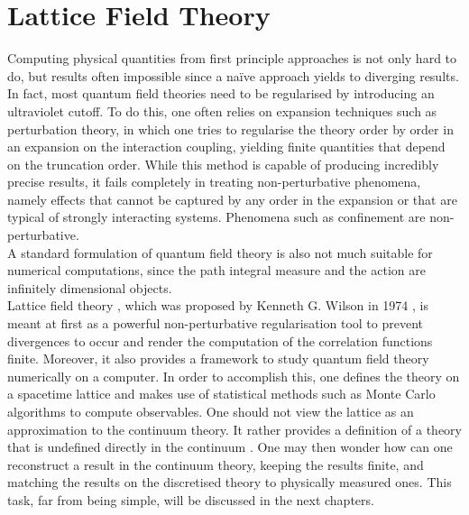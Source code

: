 \section{Lattice Field Theory}
Computing physical quantities from first principle approaches is not only hard to do, but results often impossible since a na\"ive approach yields to diverging results. In fact, most quantum field theories need to be regularised by introducing an ultraviolet cutoff. To do this, one often relies on expansion techniques such as perturbation theory, in which one tries to regularise the theory order by order in an expansion on the interaction coupling, yielding finite quantities that depend on the truncation order.  While this method is capable of producing incredibly precise results, it fails completely in treating non-perturbative phenomena, namely effects that cannot be captured by any order in the expansion or that are typical of strongly interacting systems.
Phenomena such as confinement are non-perturbative.\\
A standard formulation of quantum field theory is also not much suitable for numerical computations, since the path integral measure and the action are infinitely dimensional objects. \\
Lattice field theory \cite{Montvay1994QuantumLattice,rothe_LGT,gattringer_LQCD,creutz_2023}, which was proposed by Kenneth G. Wilson in 1974 \cite{wilson_lqcd}, is meant at first as a powerful non-perturbative regularisation tool to prevent divergences to occur and render the computation of the correlation functions finite. Moreover, it also provides a framework to study quantum field theory numerically on a computer. In order to accomplish this, one defines the theory on a spacetime lattice and makes use of statistical methods such as Monte Carlo algorithms to compute observables. 
One should not view the lattice as an approximation to the continuum theory. It rather
provides a definition of a theory that is undefined directly in the continuum \cite{Wiese:2009qsa}. One may then wonder how can one reconstruct a result in the continuum theory, keeping the results finite, and matching the results on the discretised theory to physically measured ones. This task, far from being simple, will be  discussed in the next chapters.\

